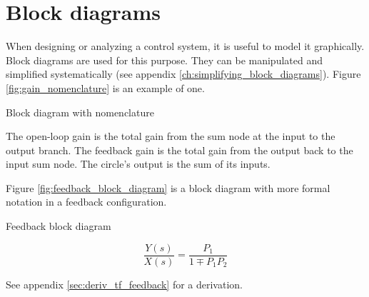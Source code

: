 \section{Block diagrams}

When designing or analyzing a \gls{control system}, it is useful to model it
graphically. Block diagrams are used for this purpose. They can be manipulated
and simplified systematically (see appendix
\ref{ch:simplifying_block_diagrams}). Figure \ref{fig:gain_nomenclature} is an
example of one.

\begin{bookfigure}

  \caption{Block diagram with nomenclature}
  \label{fig:gain_nomenclature}
\end{bookfigure}

The \gls{open-loop gain} is the total gain from the sum node at the input to the
output branch. The feedback gain is the total gain from the output back to the
input sum node. The circle's output is the sum of its inputs.

Figure \ref{fig:feedback_block_diagram} is a block diagram with more formal
notation in a feedback configuration.

\begin{bookfigure}

  \caption{Feedback block diagram}
  \label{fig:feedback_block_diagram}
\end{bookfigure}

\begin{theorem}
  \begin{equation}
    \frac{Y(s)}{X(s)} = \frac{P_1}{1 \mp P_1 P_2}
  \end{equation}
\end{theorem}

See appendix \ref{sec:deriv_tf_feedback} for a derivation.
